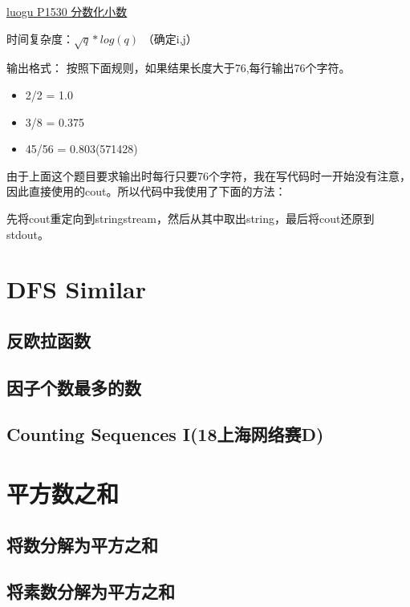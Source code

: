 \href{https://www.luogu.org/problem/P1530}{luogu P1530 分数化小数}

时间复杂度：$\sqrt{q}*log(q)$ \quad （确定i,j）

输出格式： 按照下面规则，如果结果长度大于76,每行输出76个字符。
\begin{itemize}
	\item 2/2 = 1.0
	\item 3/8 = 0.375
	\item 45/56 = 0.803(571428)
\end{itemize}



\begin{note}
	由于上面这个题目要求输出时每行只要$76$个字符，我在写代码时一开始没有注意，因此直接使用的cout。所以代码中我使用了下面的方法：
	
	
	先将cout重定向到stringstream，然后从其中取出string，最后将cout还原到stdout。
\end{note}

\section{DFS Similar}
\subsection{反欧拉函数}

\subsection{因子个数最多的数}

\subsection{Counting Sequences I(18上海网络赛D)}

\section{平方数之和}

\subsection{将数分解为平方之和}


\subsection{将素数分解为平方之和}

